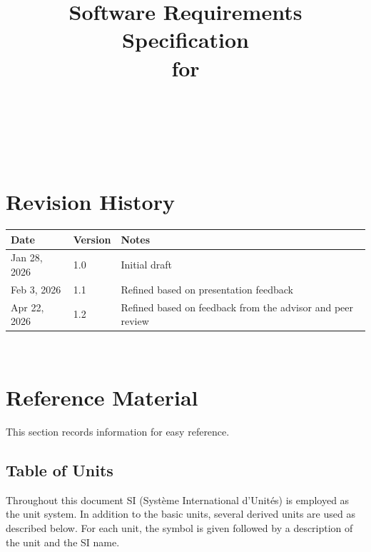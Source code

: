 \documentclass[12pt]{article}
\begin{document}
\title{Software Requirements Specification \\ for \progname{}} 
\author{\authname}
\date{}
	
\maketitle

~\newpage


\tableofcontents


~\newpage








\section*{Revision History}


\begin{tabularx}{\textwidth}{p{3cm}p{2cm}X}
\toprule {\bf Date} & {\bf Version} & {\bf Notes}\\
\midrule
    Jan 28, 2026 & 1.0 & Initial draft \\
    Feb 3, 2026 & 1.1 & Refined based on presentation feedback \\
    Apr 22, 2026 & 1.2 & Refined based on feedback from the advisor and peer review \\
\bottomrule
\end{tabularx}


~\newpage








\section{Reference Material}


This section records information for easy reference.




\subsection{Table of Units}


Throughout this document SI (Syst\`{e}me International d'Unit\'{e}s) is employed as the unit system.  In addition to the basic units, several derived units are used as described below.  For each unit, the symbol is given followed by a description of the unit and the SI name.
\end{document}

